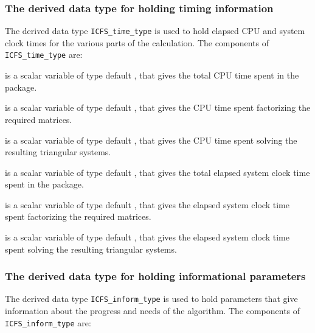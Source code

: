 \documentclass{galahad}
\newcommand{\packagename}{ICFS}
\begin{document}

\subsubsection{The derived data type for holding timing
 information}\label{typetime}
The derived data type
{\tt \packagename\_time\_type}
is used to hold elapsed CPU and system clock times for the various parts of
the calculation. The components of
{\tt \packagename\_time\_type}
are:
\begin{description}
 is a scalar variable of type default \realdp, that gives
 the total CPU time spent in the package.

 is a scalar variable of type default \realdp, that gives
 the CPU time spent factorizing the required matrices.

 is a scalar variable of type default \realdp, that gives
 the CPU time spent solving the resulting triangular systems.

 is a scalar variable of type default \realdp, that gives
 the total elapsed system clock time spent in the package.

 is a scalar variable of type default \realdp, that gives
 the elapsed system clock time spent factorizing the required matrices.

 is a scalar variable of type default \realdp, that gives
 the elapsed system clock time spent solving the resulting triangular systems.

\end{description}


\subsubsection{The derived data type for holding informational
 parameters}\label{typeinform}
The derived data type
{\tt \packagename\_inform\_type}
is used to hold parameters that give information about the progress and needs
of the algorithm. The components of
{\tt \packagename\_inform\_type}
are:
\end{document}

